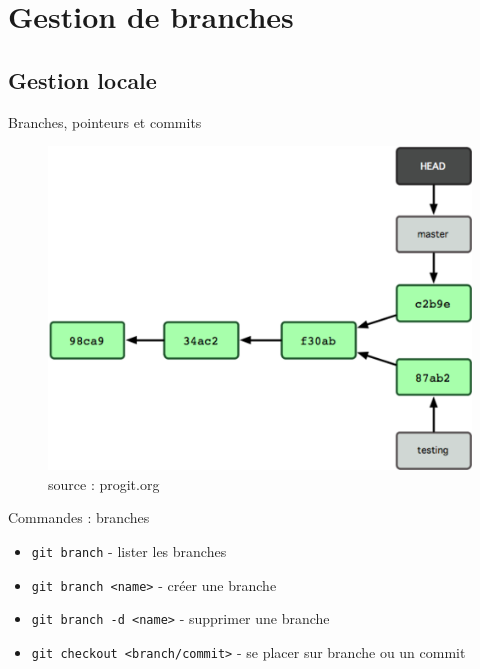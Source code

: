 \documentclass{beamer}
\begin{document}
\section{Gestion de branches}
\subsection*{Gestion locale}
\begin{frame}{Branches, pointeurs et commits}
  \begin{figure}
    \begin{center}
      \includegraphics[scale=0.8]{img/Branch1.png}
    \end{center}
    \caption{source : progit.org}
  \end{figure}
\end{frame}

\begin{frame}[containsverbatim]{Commandes : branches}
  \begin{itemize}
  \item \lstinline|git branch| - lister les branches
  \item \lstinline|git branch <name>| - créer une branche
  \item \lstinline|git branch -d <name>| - supprimer une branche
  \item \lstinline|git checkout <branch/commit>| - se placer sur branche ou un commit
  \end{itemize}
\end{frame}
\end{document}
